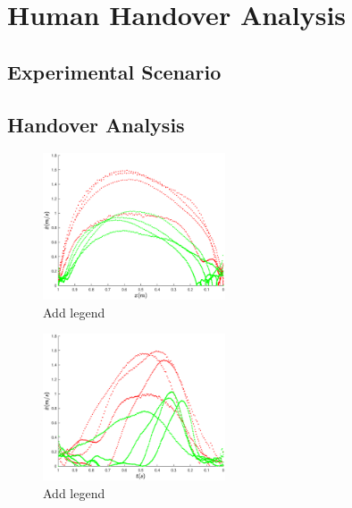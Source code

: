 \section{Human Handover Analysis}

\subsection{Experimental Scenario}


\subsection{Handover Analysis}
    \begin{figure}[t]
      \centering
      \includegraphics[width = 0.48\textwidth]{Images/vel_distance_plot.eps}
      \caption{Add legend} 
      \label{fig:vel_distance}
	\end{figure}
	
	
    \begin{figure}[t]
      \centering
      \includegraphics[width = 0.48\textwidth]{Images/vel_time_plot.eps}
      \caption{Add legend} 
      \label{fig:vel_time}
	\end{figure}
	